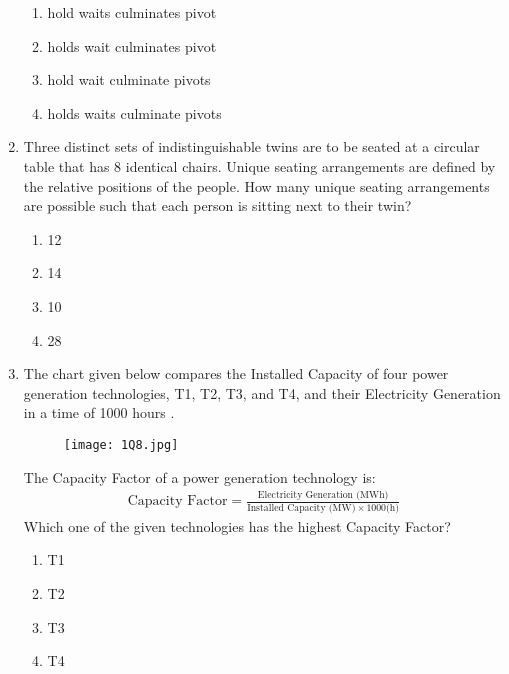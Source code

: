 \documentclass[journal,12pt,onecolumn]{article}
\theoremstyle{remark}
\begin{document}
\begin{enumerate}
    \hfill{}
    \begin{enumerate}
        \item {} hold  waits  culminates  pivot
        \item {} holds  wait  culminates  pivot
        \item {} hold  wait  culminate  pivots
        \item {} holds  waits  culminate  pivots
    \end{enumerate}

    \item Three distinct sets of indistinguishable twins are to be seated at a circular table that has 8 identical chairs. Unique seating arrangements are defined by the relative positions of the people. How many unique seating arrangements are possible such that each person is sitting next to their twin?

    \hfill{}
    \begin{enumerate}
        \item 12
        \item 14
        \item 10
        \item 28
    \end{enumerate}

    \item The chart given below  compares the Installed Capacity  of four power generation technologies, T1, T2, T3, and T4, and their Electricity Generation  in a time of 1000 hours .
    \begin{figure}[H]
        \centering
        \texttt{[image: 1Q8.jpg]}
        \caption{}
        \label{fig:q8}
    \end{figure}
    The Capacity Factor of a power generation technology is:
    \begin{align}
    \text{Capacity Factor} = \frac{\text{Electricity Generation (MWh)}}{\text{Installed Capacity (MW)} \times 1000 \text{(h)}}
    \end{align}
    Which one of the given technologies has the highest Capacity Factor?

    \hfill{}
    \begin{enumerate}
        \item T1
        \item T2
        \item T3
        \item T4
    \end{enumerate}


\end{enumerate}
\end{document}
